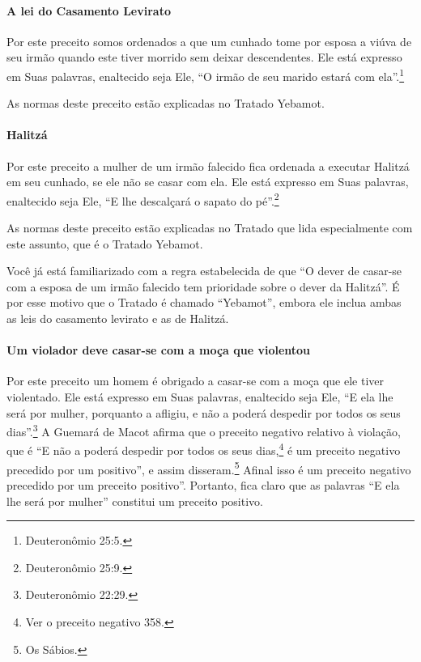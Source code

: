\paragraph{A lei do Casamento Levirato}

Por este preceito somos ordenados a que um cunhado tome por esposa a
viúva de seu irmão quando este tiver morrido sem deixar descendentes.
Ele está expresso em Suas palavras, enaltecido seja Ele, ``O irmão de
seu marido estará com ela''.\footnote{Deuteronômio 25:5.}

As normas deste preceito estão explicadas no Tratado Yebamot.

\paragraph{Halitzá}

Por este preceito a mulher de um irmão falecido fica ordenada a
executar Halitzá em seu cunhado, se ele não se casar com ela. Ele
está expresso em Suas palavras, enaltecido seja Ele, ``E lhe descalçará
o sapato do pé''.\footnote{Deuteronômio 25:9.}

As normas deste preceito estão explicadas no Tratado que lida
especialmente com este assunto, que é o Tratado Yebamot.

Você já está familiarizado com a regra estabelecida de que ``O dever de
casar-se com a esposa de um irmão falecido tem prioridade sobre o dever
da Halitzá''. É por esse motivo que o Tratado é chamado ``Yebamot'',
embora ele inclua ambas as leis do casamento levirato e as de
Halitzá.

\paragraph{Um violador deve casar-se com a moça que violentou}

Por este preceito um homem é obrigado a casar-se com a moça que ele
tiver violentado. Ele está expresso em Suas palavras, enaltecido seja
Ele, ``E ela lhe será por mulher, porquanto a afligiu, e não a poderá
despedir por todos os seus dias''.\footnote{Deuteronômio 22:29.} A Guemará de
Macot afirma que o preceito negativo relativo à violação, que é ``E não
a poderá despedir por todos os seus dias,\footnote{Ver o preceito negativo 358.} é um preceito negativo precedido por um positivo'', e assim
disseram.\footnote{Os Sábios.} Afinal isso é um preceito negativo
precedido por um preceito positivo''. Portanto, fica claro que as palavras ``E ela lhe será por mulher'' constitui um preceito positivo.


